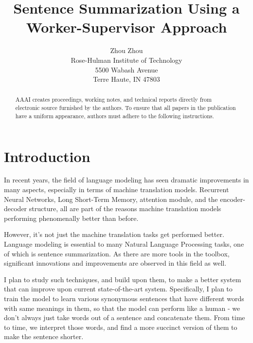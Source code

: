 \documentclass[letterpaper]{article} %
\begin{document}
%
\title{Sentence Summarization Using a Worker-Supervisor Approach}
\author{Zhou Zhou\\
Rose-Hulman Institute of Technology\\
5500 Wabash Avenue\\
Terre Haute, IN 47803\\
}
\maketitle
\begin{abstract}
AAAI creates proceedings, working notes, and technical reports directly from electronic source furnished by the authors. To ensure that all papers in the publication have a uniform appearance, authors must adhere to the following instructions. 
\end{abstract}

\section{Introduction}
In recent years, the field of language modeling has seen dramatic improvements in many aspects, especially in terms of machine translation models. Recurrent Neural Networks, Long Short-Term Memory, attention module, and the encoder-decoder structure, all are part of the reasons machine translation models performing phenomenally better than before.

However, it’s not just the machine translation tasks get performed better. Language modeling is essential to many Natural Language Processing tasks, one of which is sentence summarization. As there are more tools in the toolbox, significant innovations and improvements are observed in this field as well.

I plan to study such techniques, and build upon them, to make a better system that can improve upon current state-of-the-art system. Specifically, I plan to train the model to learn various synonymous sentences that have different words with same meanings in them, so that the model can perform like a human - we don’t always just take words out of a sentence and concatenate them. From time to time, we interpret those words, and find a more succinct version of them to make the sentence shorter.
\end{document}
